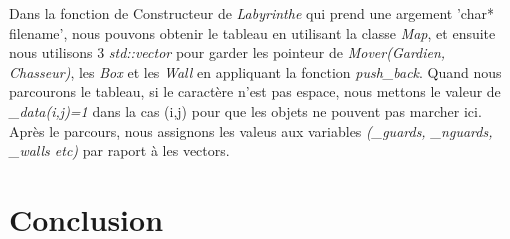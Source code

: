 \documentclass{article}
\begin{document}
Dans la fonction de Constructeur de \textsl{Labyrinthe} qui prend une argement 'char* filename', nous pouvons obtenir le tableau en utilisant la classe \textsl{Map}, et ensuite nous utilisons 3 \textsl{std::vector} pour garder les pointeur de \textsl{Mover(Gardien, Chasseur)}, les \textsl{Box} et les \textsl{Wall} en appliquant la fonction \textsl{push\_back}. Quand nous parcourons le tableau, si le caractère n'est pas espace, nous mettons le valeur de \textsl{\_data(i,j)=1} dans la cas (i,j) pour que les objets ne pouvent pas marcher ici. Après le parcours, nous assignons les valeus aux variables \textsl{(\_guards, \_nguards, \_walls etc)} par raport à les vectors.

\section{Conclusion}

 
% 

\end{document}
